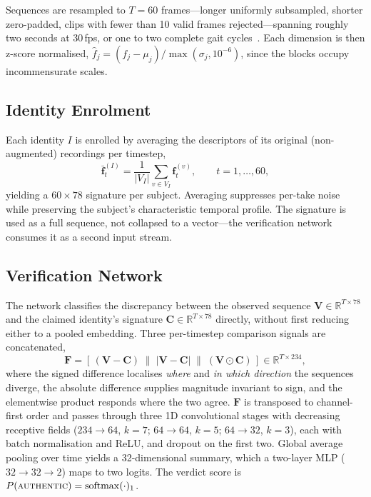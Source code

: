 \documentclass[conference]{IEEEtran}
\begin{document}
Sequences are resampled to $T = 60$ frames---longer uniformly subsampled,
shorter zero-padded, clips with fewer than 10 valid frames rejected---spanning
roughly two seconds at 30\,fps, or one to two complete gait
cycles~\cite{perry_gait}. Each dimension is then z-score normalised,
$\hat{f}_j = (f_j - \mu_j)/\max(\sigma_j, 10^{-6})$, since the blocks occupy
incommensurate scales.

\subsection{Identity Enrolment}
\label{sec:enrollment}

Each identity $I$ is enrolled by averaging the descriptors of its original
(non-augmented) recordings per timestep,
\begin{equation}
\bar{\mathbf{f}}_t^{(I)} = \frac{1}{|V_I|}\sum_{v \in V_I} \mathbf{f}_t^{(v)},
\qquad t = 1,\dots,60,
\end{equation}
yielding a $60 \times 78$ signature per subject. Averaging suppresses per-take
noise while preserving the subject's characteristic temporal profile. The
signature is used as a full sequence, not collapsed to a vector---the
verification network consumes it as a second input stream.

\subsection{Verification Network}
\label{sec:verifier}

The network classifies the discrepancy between the observed sequence
$\mathbf{V} \in \mathbb{R}^{T \times 78}$ and the claimed identity's signature
$\mathbf{C} \in \mathbb{R}^{T \times 78}$ directly, without first reducing
either to a pooled embedding. Three per-timestep comparison signals are
concatenated,
\begin{equation}
\mathbf{F} = \left[\, (\mathbf{V}-\mathbf{C}) \;\|\;
|\mathbf{V}-\mathbf{C}| \;\|\;
(\mathbf{V} \odot \mathbf{C}) \,\right] \in \mathbb{R}^{T \times 234},
\end{equation}
where the signed difference localises \emph{where} and \emph{in which
direction} the sequences diverge, the absolute difference supplies magnitude
invariant to sign, and the elementwise product responds where the two agree.
$\mathbf{F}$ is transposed to channel-first order and passes through three 1D
convolutional stages with decreasing receptive fields ($234 \rightarrow 64$,
$k=7$; $64 \rightarrow 64$, $k=5$; $64 \rightarrow 32$, $k=3$), each with batch
normalisation and ReLU, and dropout on the first two. Global average pooling
over time yields a 32-dimensional summary, which a two-layer MLP
($32 \rightarrow 32 \rightarrow 2$) maps to two logits. The verdict score is
$P(\textsc{authentic}) = \mathrm{softmax}(\cdot)_1$.
\end{document}
